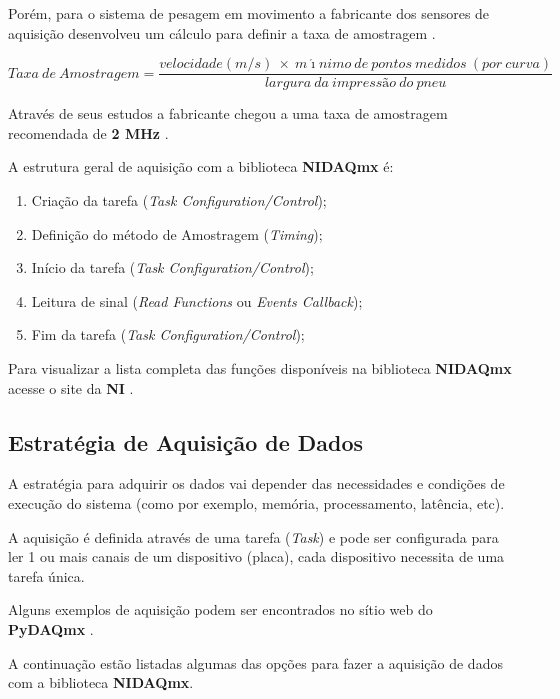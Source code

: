 \documentclass{ufscThesis}
\begin{document}
Porém, para o sistema de pesagem em movimento a fabricante dos sensores de aquisição desenvolveu um cálculo para definir a taxa de amostragem \cite[p. 9]{kistler2004installation}.

\begin{equation}
Taxa\ de\ Amostragem = \frac{velocidade(m/s)\ \times \ m\acute{\imath}nimo\ de\ pontos\ medidos\ (por\ curva)}{largura\ da\ impressão\ do\ pneu}
\end{equation}

Através de seus estudos a fabricante chegou a uma taxa de amostragem recomendada de \textbf{2 MHz} \cite[p. 9]{kistler-instruction-manual}.

A estrutura geral de aquisição com a biblioteca \textbf{NIDAQmx} é: 
\begin{enumerate}
\item Criação da tarefa (\textit{Task Configuration/Control});
\item Definição do método de Amostragem (\textit{Timing});
\item Início da tarefa (\textit{Task Configuration/Control});
\item Leitura de sinal (\textit{Read Functions} ou \textit{Events Callback});
\item Fim da tarefa (\textit{Task Configuration/Control});
\end{enumerate}

Para visualizar a lista completa das funções disponíveis na biblioteca \textbf{NIDAQmx} acesse o site da \textbf{NI} \cite{nidaqmx-c-reference}.


\subsection{Estratégia de Aquisição de Dados}\label{estrategia-aquisicao}
A estratégia para adquirir os dados vai depender das necessidades e condições de execução do sistema (como por exemplo, memória, processamento, latência, etc). 

A aquisição é definida através de uma tarefa (\textit{Task}) e pode ser configurada para ler 1 ou mais canais de um dispositivo (placa), cada dispositivo necessita de uma tarefa única.

Alguns exemplos de aquisição podem ser encontrados no sítio web do \textbf{PyDAQmx} \cite{pydaqmx}.

A continuação estão listadas algumas das opções para fazer a aquisição de dados com a biblioteca \textbf{NIDAQmx}. 
\end{document}
